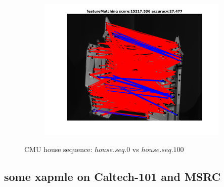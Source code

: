 \begin{figure}[h]
\begin{subfigure}[b]{0.3\textwidth}
		\includegraphics[scale=0.25]{"chapter3/fig/HouseSeq/anchor_descr/using_cpd_afftrafo/ext_solution/fi_11_featureMatching"}  
	\end{subfigure} 
	
	\caption{CMU house sequence: $house.seq.0$ vs $house.seq.100$}
\end{figure}
\FloatBarrier

\subsection{some xapmle on Caltech-101 and MSRC}